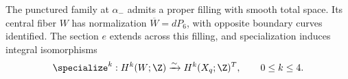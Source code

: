 \begin{proposition}\label{fill:a2}
The punctured family at $\alpha_-$ admits a proper filling with
smooth total space. Its central fiber $W$ has normalization
$\overline W=dP_6$, with opposite boundary curves identified.
The section $e$ extends across this filling, and
specialization induces integral isomorphisms
\[
 \specialize^k:H^k(W;\Z)\xrightarrow{\sim}H^k(X_q;\Z)^T,
 \qquad 0\leq k\leq4.
\]
\end{proposition}
